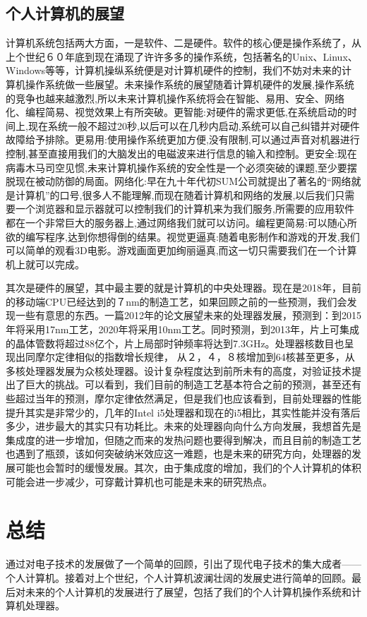 \documentclass[a4paper]{ctexart}
\begin{document}
\subsection{个人计算机的展望}
计算机系统包括两大方面，一是软件、二是硬件。软件的核心便是操作系统了，从上个世纪６０年底到现在涌现了许许多多的操作系统，包括著名的Unix、Linux、Windows等等，计算机操纵系统便是对计算机硬件的控制，我们不妨对未来的计算机操作系统做一些展望。未来操作系统的展望随着计算机硬件的发展,操作系统的竞争也越来越激烈,所以未来计算机操作系统将会在智能、易用、安全、网络化、编程简易、视觉效果上有所突破。更智能:对硬件的需求更低,在系统启动的时间上,现在系统一般不超过20秒,以后可以在几秒内启动,系统可以自己纠错并对硬件故障给予排除。更易用:使用操作系统更加方便,没有限制,可以通过声音对机器进行控制,甚至直接用我们的大脑发出的电磁波来进行信息的输入和控制。更安全:现在病毒木马司空见惯,未来计算机操作系统的安全性是一个必须突破的课题,至少要摆脱现在被动防御的局面。网络化:早在九十年代初SUM公司就提出了著名的“网络就是计算机”的口号,很多人不能理解,而现在随着计算机和网络的发展,以后我们只需要一个浏览器和显示器就可以控制我们的计算机来为我们服务,所需要的应用软件都在一个非常巨大的服务器上,通过网络我们就可以访问。编程更简易:可以随心所欲的编写程序,达到你想得倒的结果。视觉更逼真:随着电影制作和游戏的开发,我们可以简单的观看3D电影。游戏画面更加绚丽逼真,而这一切只需要我们在一个计算机上就可以完成\cite{王波2011个人计算机操作系统的发展与展望}。

其次是硬件的展望，其中最主要的就是计算机的中央处理器。现在是2018年，目前的移动端CPU已经达到的７nm的制造工艺，如果回顾之前的一些预测，我们会发现一些有意思的东西。一篇2012年的论文展望未来的处理器发展，预测到：到2015年将采用17nm工艺，2020年将采用10nm工艺。同时预测，到2013年，片上可集成的晶体管数将超过88亿个，片上局部时钟频率将达到7.3GHz。处理器核数目也呈现出同摩尔定律相似的指数增长规律， 从２，４，８核增加到64核甚至更多，从多核处理器发展为众核处理器。设计复杂程度达到前所未有的高度，对验证技术提出了巨大的挑战\cite{郭阳2012片上多核处理器验证}。可以看到，我们目前的制造工艺基本符合之前的预测，甚至还有些超过当年的预测，摩尔定律依然满足，但是我们也应该看到，目前处理器的性能提升其实是非常少的，几年的Intel i5处理器和现在的i5相比，其实性能并没有落后多少，进步最大的其实只有功耗比。未来的处理器向向什么方向发展，我想首先是集成度的进一步增加，但随之而来的发热问题也要得到解决，而且目前的制造工艺也遇到了瓶颈，该如何突破纳米效应这一难题，也是未来的研究方向，处理器的发展可能也会暂时的缓慢发展。其次，由于集成度的增加，我们的个人计算机的体积可能会进一步减少，可穿戴计算机也可能是未来的研究热点。
\section{总结}
通过对电子技术的发展做了一个简单的回顾，引出了现代电子技术的集大成者——个人计算机。接着对上个世纪，个人计算机波澜壮阔的发展史进行简单的回顾。最后对未来的个人计算机的发展进行了展望，包括了我们的个人计算机操作系统和计算机处理器。
\clearpage

\end{document}
